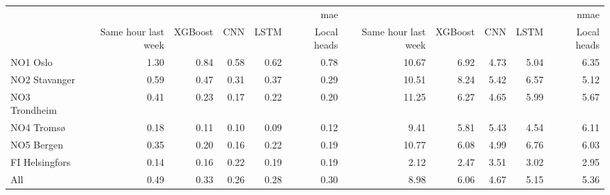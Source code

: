 \begin{tabular}{lrrrrrrrrrr}
\toprule
 & \multicolumn{5}{r}{mae} & \multicolumn{5}{r}{nmae} \\
 & Same hour last week & XGBoost & CNN & LSTM & Local heads & Same hour last week & XGBoost & CNN & LSTM & Local heads \\
\midrule
NO1 Oslo & 1.30 & 0.84 & 0.58 & 0.62 & 0.78 & 10.67 & 6.92 & 4.73 & 5.04 & 6.35 \\
NO2 Stavanger & 0.59 & 0.47 & 0.31 & 0.37 & 0.29 & 10.51 & 8.24 & 5.42 & 6.57 & 5.12 \\
NO3 Trondheim & 0.41 & 0.23 & 0.17 & 0.22 & 0.20 & 11.25 & 6.27 & 4.65 & 5.99 & 5.67 \\
NO4 Tromsø & 0.18 & 0.11 & 0.10 & 0.09 & 0.12 & 9.41 & 5.81 & 5.43 & 4.54 & 6.11 \\
NO5 Bergen & 0.35 & 0.20 & 0.16 & 0.22 & 0.19 & 10.77 & 6.08 & 4.99 & 6.76 & 6.03 \\
FI Helsingfors & 0.14 & 0.16 & 0.22 & 0.19 & 0.19 & 2.12 & 2.47 & 3.51 & 3.02 & 2.95 \\
All & 0.49 & 0.33 & 0.26 & 0.28 & 0.30 & 8.98 & 6.06 & 4.67 & 5.15 & 5.36 \\
\bottomrule
\end{tabular}
